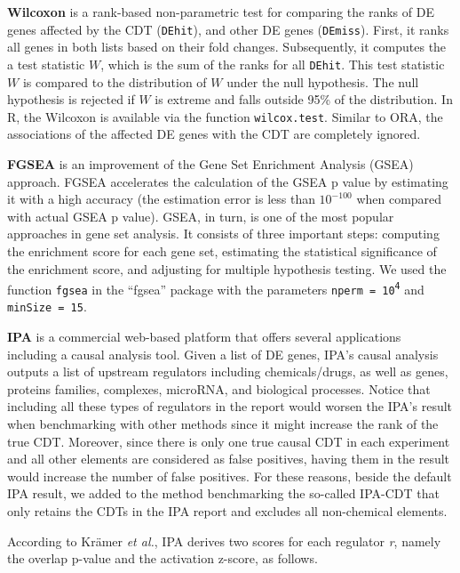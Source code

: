 \documentclass[Minh_PhD_thesis.tex]{subfiles}
\begin{document}
\textbf{Wilcoxon} is a rank-based non-parametric test for comparing the ranks of DE genes affected by the CDT (\texttt{DEhit}), and other DE genes (\texttt{DEmiss}). First, it ranks all genes in both lists based on their fold changes. Subsequently, it computes the a test statistic $W$, which is the sum of the ranks for all \texttt{DEhit}. This test statistic $W$ is compared to the distribution of $W$ under the null hypothesis. The null hypothesis is rejected if $W$ is extreme and falls outside 95\% of the distribution. In R, the Wilcoxon is available via the function \texttt{wilcox.test}.  Similar to ORA, the  associations of the affected DE genes with the CDT are completely ignored.

\textbf{FGSEA} is an improvement of the Gene Set Enrichment Analysis (GSEA) approach. FGSEA accelerates the calculation of the GSEA p value by estimating it with a high accuracy (the estimation error is less than $10^{-100}$ when compared with actual GSEA p value). GSEA, in turn, is one of the most popular approaches in gene set analysis\cite{Subramanian:2005}. It consists of three important steps: computing the enrichment score for each gene set, estimating the statistical significance of the enrichment score, and adjusting for multiple hypothesis testing. We used the function \texttt{fgsea} in the ``fgsea'' package with the parameters \texttt{nperm = 10\textsuperscript{4}} and \texttt{minSize = 15}.

\textbf{IPA} is a commercial web-based platform that offers several applications including a causal analysis tool\cite{kramer2013causal}. Given a list of DE genes, IPA's causal analysis outputs a list of upstream regulators including chemicals/drugs, as well as genes, proteins families, complexes, microRNA, and biological processes.
Notice that including all these types of regulators in the report would worsen the IPA's result when benchmarking with other methods since it might increase the rank of the true CDT. Moreover, since there is only one true causal CDT in each experiment and all other elements are considered as false positives, having them in the result would increase the number of false positives. 
For these reasons, beside the default IPA result, we added to the method benchmarking the so-called IPA-CDT  that only retains the CDTs in the IPA report and excludes all non-chemical elements.

According to Kr\"{a}mer \textit{et al.}, IPA derives two scores for each regulator \textit{r}, namely the overlap p-value and the activation z-score, as follows.
\end{document}
